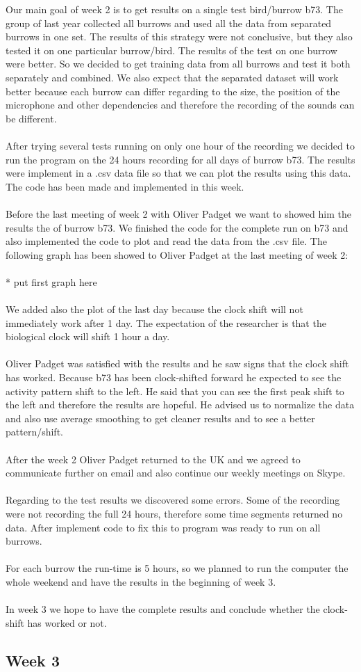 \documentclass[a4paper]{article}
\begin{document}
Our main goal of week 2 is to get results on a single test bird/burrow b73. The group of last year collected all burrows and used all the data from separated burrows in one set.  The results of this strategy were not conclusive, but they also tested it on one particular burrow/bird. The results of the test on one burrow were better. So we decided to get training data from all burrows and test it both separately and combined. We also expect that the separated dataset will work better because each burrow can differ regarding to the size, the position of the microphone and other dependencies and therefore the recording of the sounds can be different.\\\\
After trying several tests running on only one hour of the recording we decided to run the program on the 24 hours recording for all days of burrow b73. The results were implement in a .csv data file so that we can plot the results using this data. The code has been made and implemented in this week. \\\\
Before the last meeting of week 2 with Oliver Padget we want to showed him the results the of burrow b73. We finished the code for the complete run on b73 and also implemented the code to plot and read the data from the .csv file. The following graph has been showed  to Oliver Padget at the last meeting of week 2:\\\\
* put first graph here\\\\
We added also the plot of the last day because the clock shift will not immediately work after 1 day. The expectation of the researcher is that the biological clock will shift 1 hour a day. \\\\
Oliver Padget was satisfied with the results and he saw signs that the clock shift has worked. Because b73 has been clock-shifted forward he expected to see the activity pattern shift to the left. He said that you can see the first peak shift to the left and therefore the results are hopeful. He advised us to normalize the data and also use average smoothing to get cleaner results and to see a better pattern/shift.\\\\
After the week 2 Oliver Padget returned to the UK and we agreed to communicate further on email and also continue our weekly meetings on Skype.\\\\
Regarding to the test results we discovered some errors. Some of the recording were not recording the full 24 hours, therefore some time segments returned no data. After implement code to fix this to program was ready to run on all burrows.\\\\
For each burrow the run-time is 5 hours, so we planned to run the computer the whole weekend and have the results in the beginning of week 3.\\\\
In week 3 we hope to have the complete results and conclude whether the clock-shift has worked or not. 

\subsection*{Week 3}
\end{document}
